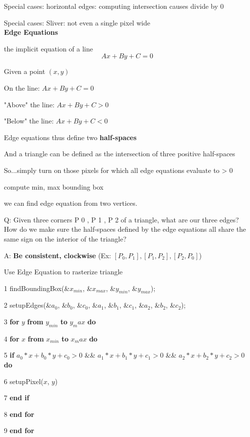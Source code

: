 \documentclass[]{report}
\begin{document}
Special cases: horizontal edges: computing intersection causes divide by 0

Special cases: Sliver: not even a single pixel wide\\
\textbf{Edge Equations}

the implicit equation of a line
$$Ax + By + C = 0$$

Given a point $(x, y)$

On the line: $Ax + By + C = 0$

"Above" the line: $Ax + By + C > 0$

"Below" the line: $Ax + By + C < 0$

Edge equations thus define two \textbf{half-spaces}

And a triangle can be defined as the intersection of three
positive half-spaces

So...simply turn on those pixels for which all edge
equations evaluate to > 0

compute min, max bounding box

we can find edge equation from two vertices.

Q: Given three corners P 0 , P 1 , P 2 of a triangle, what are our
three edges?How do we make sure the half-spaces defined by the
edge equations all share the same sign on the interior of
the triangle?

A: \textbf{Be consistent, clockwise} (Ex: $[P_0, P_1], [P_1, P_2], [P_2, P_0]$)
\begin{algorithm}[h]
	\caption{Use Edge Equation to rasterize triangle}
	\begin{algorithmic}[1]
		\item[1] findBoundingBox(\&$x_{min}$, \&$x_{max}$, \&$y_{min}$, \&$y_{max}$);
		\item[2] setupEdges(\&$a_0$, \&$b_0$, \&$c_0$, \&$a_1$, \&$b_1$, \&$c_1$, \&$a_2$, \&$b_2$, \&$c_2$);
		\item[3] \textbf{for} $y$ \textbf{from} $y_{min}$ \textbf{to} $y_max$ \textbf{do}
		\item[4] \textbf{for} $x$ \textbf{from} $x_{min}$ \textbf{to} $x_max$ \textbf{do}
		\item[5] \textbf{if} $a_0*x + b_0 * y + c_0 > 0$ \&\& $a_1*x + b_1 * y + c_1 > 0$ \&\& $a_2*x + b_2 * y + c_2 > 0$ \textbf{do}
		\item[6] setupPixel($x$, $y$)
		\item[7] \textbf{end if}
		\item[8] \textbf{end for}
		\item[9] \textbf{end for}
	\end{algorithmic}
\end{algorithm}
\end{document}
